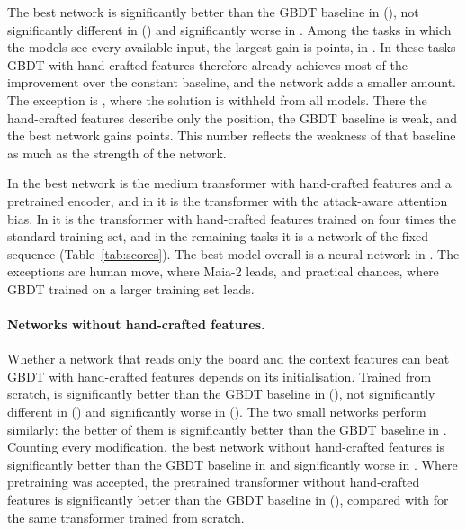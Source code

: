 \documentclass[11pt]{article}
\begin{document}
The best network is significantly better than the GBDT baseline in
 (), not significantly
different in  () and
significantly worse in . Among the
 tasks in which the models see every available input, the
largest gain is  points, in
. In these tasks GBDT with hand-crafted
features therefore already achieves most of the improvement over the
constant baseline, and the network adds a smaller amount. The exception is
, where the solution is withheld from all models. There
the hand-crafted features describe only the position, the GBDT baseline is
weak, and the best network gains
 points. This number
reflects the weakness of that baseline as much as the strength of the
network.

In  the
best network is the medium transformer with hand-crafted features and a
pretrained encoder, and in
 it is the
transformer with the attack-aware attention bias. In
 it is the
transformer with hand-crafted features trained on four times the standard
training set, and in the remaining tasks it is a network of the fixed
sequence (Table~\ref{tab:scores}). The best model overall is a neural network
in . The exceptions are human move, where Maia-2
leads, and practical chances, where GBDT trained on a larger training set
leads.

\paragraph{Networks without hand-crafted features.}
Whether a network that reads only the board and the context features can
beat GBDT with hand-crafted features depends on its initialisation. Trained
from scratch,  is significantly better than the GBDT
baseline in  (),
not significantly different in 
() and significantly worse in
 (). The two
small networks perform similarly: the better of them is significantly better
than the GBDT baseline in . Counting every
modification, the best network without hand-crafted features is
significantly better than the GBDT baseline in  and
significantly worse in . Where pretraining was
accepted, the pretrained transformer without hand-crafted features is
significantly better than the GBDT baseline in
 (),
compared with  for the same transformer
trained from scratch.
\end{document}
